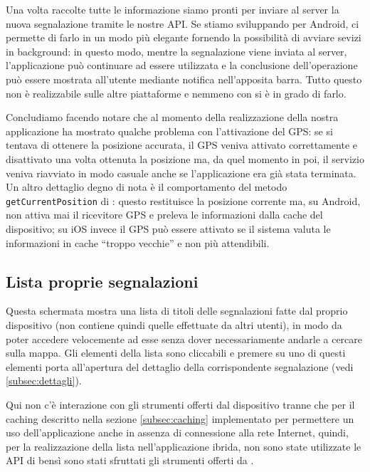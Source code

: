 			Una volta raccolte tutte le informazione siamo pronti per inviare
			al server la nuova segnalazione tramite le nostre API. Se stiamo
			sviluppando per Android, \tisdk{} ci permette di farlo in un modo
			più elegante fornendo la possibilità di avviare sevizi in
			background: in questo modo, mentre la segnalazione viene inviata al
			server, l'applicazione può continuare ad essere utilizzata e la
			conclusione dell'operazione	può essere mostrata all'utente mediante
			notifica nell'apposita barra. Tutto questo non è realizzabile sulle
			altre piattaforme e nemmeno con \pg{} si è in grado di farlo.
			
			Concludiamo facendo notare che al momento della realizzazione della
			nostra applicazione \pg{} ha mostrato qualche problema con
			l'attivazione del GPS: se si tentava di ottenere la posizione
			accurata, il GPS veniva attivato correttamente e disattivato una
			volta ottenuta la posizione ma, da quel momento in poi, il servizio
			veniva riavviato in modo casuale anche se l'applicazione era già
			stata terminata. Un altro dettaglio degno di nota è il comportamento
			del metodo \texttt{getCurrentPosition} di \tisdk{}: questo
			restituisce la posizione corrente ma, su Android, non attiva mai il
			ricevitore GPS e preleva le informazioni dalla cache del
			dispositivo; su iOS invece il GPS può essere attivato se il sistema
			valuta le informazioni in cache ``troppo vecchie'' e non più
			attendibili.
			
		\subsection{Lista proprie segnalazioni}
			Questa schermata mostra una lista di titoli delle segnalazioni fatte
			dal proprio dispositivo (non contiene quindi quelle effettuate da altri 
			utenti), in modo da poter accedere velocemente ad esse 
			senza dover necessariamente andarle a cercare sulla mappa.
			Gli elementi della lista sono cliccabili e premere su uno di questi 
			elementi porta all'apertura del dettaglio della corrispondente 
			segnalazione (vedi \ref{subsec:dettagli}).
			
			Qui non c'è interazione con gli strumenti offerti dal dispositivo
			tranne che per il caching descritto nella sezione \ref{subsec:caching}
			implementato per permettere un uso dell'applicazione 
			anche in assenza di connessione alla rete Internet, 
			quindi, per la realizzazione della lista nell'applicazione ibrida, non sono
            state utilizzate le API di \pg{} bensì sono stati sfruttati gli
            strumenti offerti da \kendomob{}.
			
